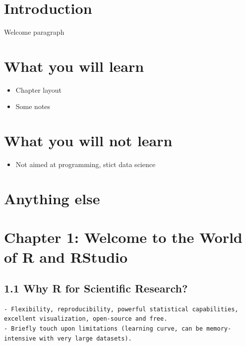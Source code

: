 \documentclass[
  letterpaper,
  DIV=11,
  numbers=noendperiod]{scrreprt}
\providecommand{\tightlist}{%
  \setlength{\itemsep}{0pt}\setlength{\parskip}{0pt}}\usepackage{longtable,booktabs,array}
\begin{document}

\chapter{Introduction}\label{introduction}

Welcome paragraph


\chapter{What you will learn}\label{what-you-will-learn}

\begin{itemize}
\tightlist
\item
  Chapter layout
\item
  Some notes
\end{itemize}


\chapter{What you will not learn}\label{what-you-will-not-learn}

\begin{itemize}
\tightlist
\item
  Not aimed at programming, stict data science
\end{itemize}


\chapter{Anything else}\label{anything-else}


\chapter{Chapter 1: Welcome to the World of R and
RStudio}\label{chapter-1-welcome-to-the-world-of-r-and-rstudio}

\section{1.1 Why R for Scientific
Research?}\label{why-r-for-scientific-research}

\begin{verbatim}
- Flexibility, reproducibility, powerful statistical capabilities, excellent visualization, open-source and free.
- Briefly touch upon limitations (learning curve, can be memory-intensive with very large datasets).
\end{verbatim}
\end{document}
